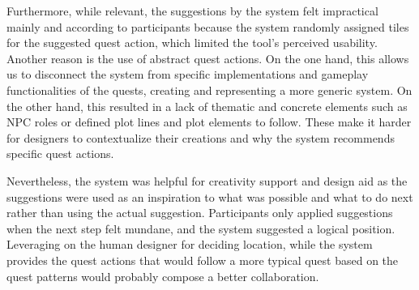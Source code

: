 Furthermore, while relevant, the suggestions by the system felt impractical mainly and according to participants because the system randomly assigned tiles for the suggested quest action, which limited the tool's perceived usability. Another reason is the use of abstract quest actions. On the one hand, this allows us to disconnect the system from specific implementations and gameplay functionalities of the quests, creating and representing a more generic system. On the other hand, this resulted in a lack of thematic and concrete elements such as NPC roles or defined plot lines and plot elements to follow. These make it harder for designers to contextualize their creations and why the system recommends specific quest actions. %


Nevertheless, the system was helpful for creativity support and design aid as the suggestions were used as an inspiration to what was possible and what to do next rather than using the actual suggestion. Participants only applied suggestions when the next step felt mundane, and the system suggested a logical position. Leveraging on the human designer for deciding location, while the system provides the quest actions that would follow a more typical quest based on the quest patterns would probably compose a better collaboration. 



